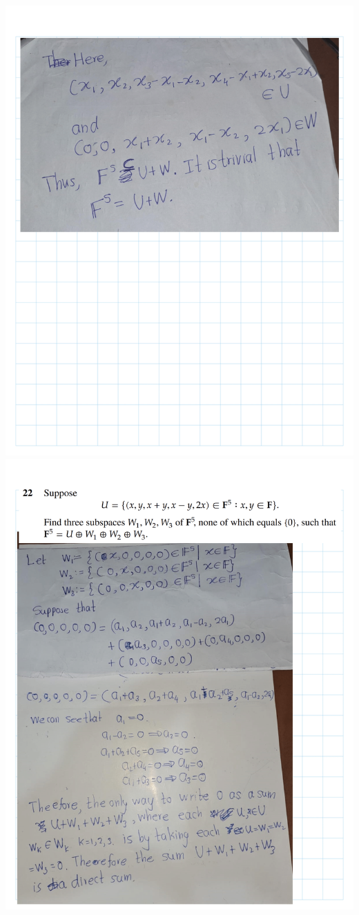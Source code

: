 \documentclass[
]{book}
\theoremstyle{definition}
\theoremstyle{definition}
\theoremstyle{definition}
\theoremstyle{definition}
\theoremstyle{remark}
\begin{document}
\begin{enumerate}
  \includegraphics{fig/Ex1C/Ex/Ex-26.png}
  \includegraphics{fig/Ex1C/Ex/Ex-27.png}

\end{enumerate}
\end{document}
